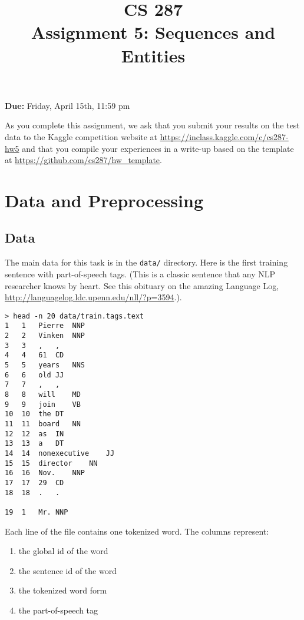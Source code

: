\documentclass[11pt]{article}
\title{CS 287 \\ Assignment 5: Sequences and Entities }
\date{}
\begin{document}
\maketitle{}

\begin{center}
  \textbf{Due:} Friday, April 15th, 11:59 pm 
\end{center}




As you complete this assignment, we ask that you submit your results
on the test data to the Kaggle competition website at
\url{https://inclass.kaggle.com/c/cs287-hw5} and that you compile your
experiences in a write-up based on the template at
\url{https://github.com/cs287/hw_template}.

\section{Data and Preprocessing}

\subsection{Data}

The main data for this task is in the \texttt{data/} directory. Here
is the first training sentence with part-of-speech tags. (This is a
classic sentence that any NLP researcher knows by heart. See this obituary on
the amazing Language Log, 
\url{http://languagelog.ldc.upenn.edu/nll/?p=3594}.).

\begin{verbatim}
> head -n 20 data/train.tags.text
1	1	Pierre	NNP
2	2	Vinken	NNP
3	3	,	,
4	4	61	CD
5	5	years	NNS
6	6	old	JJ
7	7	,	,
8	8	will	MD
9	9	join	VB
10	10	the	DT
11	11	board	NN
12	12	as	IN
13	13	a	DT
14	14	nonexecutive	JJ
15	15	director	NN
16	16	Nov.	NNP
17	17	29	CD
18	18	.	.

19	1	Mr.	NNP
\end{verbatim}

\vspace{0.5cm}

Each line of the file contains one tokenized word. The columns represent:

\begin{enumerate}
\item the global id of the word
\item the sentence id of the word
\item the tokenized word form
\item the part-of-speech tag
\end{enumerate}
\end{document}
